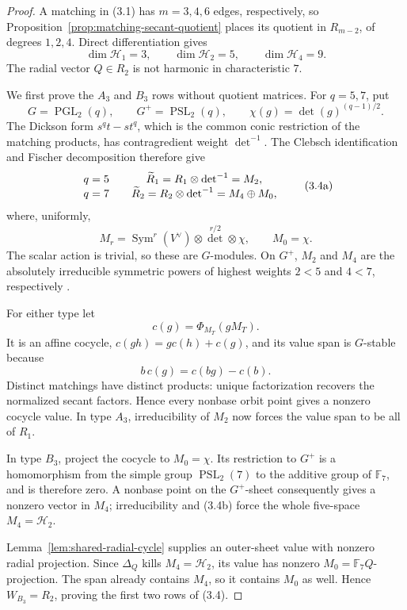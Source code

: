 \documentclass[11pt]{article}
\theoremstyle{definition}
\theoremstyle{remark}
\newcommand{\F}{\mathbb{F}}
\begin{document}
\begin{proof}
A matching in (3.1) has
$m=3,4,6$ edges, respectively, so
Proposition~\ref{prop:matching-secant-quotient} places its quotient in
$R_{m-2}$, of degrees $1,2,4$.  Direct differentiation gives
\[
 \dim\mathcal H_1=3,\qquad
 \dim\mathcal H_2=5,\qquad
 \dim\mathcal H_4=9.
\]
The radial vector \(Q\in R_2\) is not harmonic in characteristic \(7\).

We first prove the \(A_3\) and \(B_3\) rows without quotient matrices.
For \(q=5,7\), put
\[
 G=\operatorname{PGL}_2(q),\qquad
 G^+=\operatorname{PSL}_2(q),\qquad
 \chi(g)=\det(g)^{(q-1)/2}.
\]
The Dickson form \(s^qt-st^q\), which is the common conic restriction
of the matching products, has contragredient weight \(\det^{-1}\).
The Clebsch identification and Fischer decomposition therefore give
\[
\begin{array}{c@{\qquad}c}
q=5&\widetilde R_1=R_1\otimes\det^{-1}=M_2,\\
q=7&\widetilde R_2=R_2\otimes\det^{-1}=M_4\oplus M_0,
\end{array}                                                \tag{3.4a}
\]
where, uniformly,
\[
 M_r=\operatorname{Sym}^r(V^\vee)\otimes
       \det^{r/2}\otimes\chi,\qquad M_0=\chi.
\]
The scalar action is trivial, so these are \(G\)-modules.  On \(G^+\),
\(M_2\) and \(M_4\) are the absolutely irreducible symmetric powers of
highest weights \(2<5\) and \(4<7\), respectively
\cite[Fact~3.1]{BraunNebe2025}.

For either type let
\[
 c(g)=\Phi_{M_T}(gM_T).
\]
It is an affine cocycle, \(c(gh)=g c(h)+c(g)\), and its value span is
\(G\)-stable because
\[
 b\,c(g)=c(bg)-c(b).                                      \tag{3.4b}
\]
Distinct matchings have distinct products: unique factorization recovers
the normalized secant factors.  Hence every nonbase orbit point gives a
nonzero cocycle value.  In type \(A_3\), irreducibility of \(M_2\) now
forces the value span to be all of \(R_1\).

In type \(B_3\), project the cocycle to \(M_0=\chi\).  Its restriction
to \(G^+\) is a homomorphism from the simple group
\(\operatorname{PSL}_2(7)\) to the additive group of \(\F_7\), and is
therefore zero.  A nonbase point on the \(G^+\)-sheet consequently gives
a nonzero vector in \(M_4\); irreducibility and (3.4b) force the whole
five-space \(M_4=\mathcal H_2\).

Lemma~\ref{lem:shared-radial-cycle} supplies an outer-sheet value with
nonzero radial projection.  Since \(\Delta_Q\) kills
\(M_4=\mathcal H_2\), its value has nonzero
\(M_0=\F_7Q\)-projection.  The span already contains \(M_4\), so it
contains \(M_0\) as well.  Hence \(W_{B_3}=R_2\), proving the first two
rows of (3.4).


\end{proof}
\end{document}
